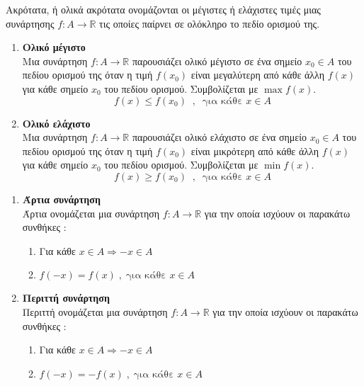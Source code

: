 \documentclass[twoside,nofonts,ektypwsh,math,spyros]{frontisthrio}
\begin{document}
Ακρότατα, ή ολικά ακρότατα ονομάζονται οι μέγιστες ή ελάχιστες τιμές μιας συνάρτησης $ f:A\rightarrow\mathbb{R} $ τις οποίες παίρνει σε ολόκληρο το πεδίο ορισμού της.
\begin{enumerate}[itemsep=0mm,label=\bf\arabic*.]
\item \textbf{Ολικό μέγιστο}\\
Μια συνάρτηση $ f:A\rightarrow\mathbb{R} $ παρουσιάζει ολικό μέγιστο σε ένα σημείο $ x_0\in A $ του πεδίου ορισμού της όταν η τιμή $ f(x_0) $ είναι μεγαλύτερη από κάθε άλλη $ f(x) $ για κάθε σημείο $ x_0 $ του πεδίου ορισμού. Συμβολίζεται με $ \max{f(x)} $. \[ f(x)\leq f(x_0)\;\;,\;\;\textrm{για κάθε } x\in A \]
\item \textbf{Ολικό ελάχιστο}\\
Μια συνάρτηση $ f:A\rightarrow\mathbb{R} $ παρουσιάζει ολικό ελάχιστο σε ένα σημείο $ x_0\in A $ του πεδίου ορισμού της όταν η τιμή $ f(x_0) $ είναι μικρότερη από κάθε άλλη $ f(x) $ για κάθε σημείο $ x_0 $ του πεδίου ορισμού. Συμβολίζεται με $ \min{f(x)}$. \[ f(x)\geq f(x_0)\;\;,\;\;\textrm{για κάθε } x\in A \]
\end{enumerate}
\vspace{-5mm}
\begin{enumerate}[itemsep=0mm,label=\bf\arabic*.]
\item \textbf{Άρτια συνάρτηση}\\ Άρτια ονομάζεται μια συνάρτηση $ f:A\rightarrow\mathbb{R} $ για την οποία ισχύουν οι παρακάτω συνθήκες :
\begin{enumerate}[itemsep=0mm,label=\roman*.]
\item Για κάθε $ x\in A\Rightarrow -x\in A $
\item $ f(-x)=f(x)\;,\;\textrm{για κάθε } x\in A$
\end{enumerate}
\item \textbf{Περιττή συνάρτηση}\\ Περιττή ονομάζεται μια συνάρτηση $ f:A\rightarrow\mathbb{R} $ για την οποία ισχύουν οι παρακάτω συνθήκες :
\begin{enumerate}[itemsep=0mm,label=\roman*.]
\item Για κάθε $ x\in A\Rightarrow -x\in A $
\item $ f(-x)=-f(x)\;,\;\textrm{για κάθε } x\in A$
\end{enumerate}
\end{enumerate}
\end{document}
